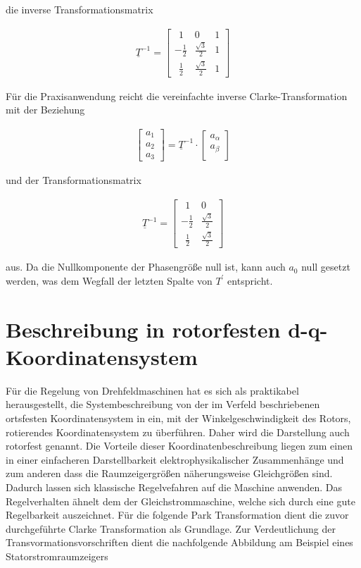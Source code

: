 die inverse Transformationsmatrix

\begin{align}
	\underline{T}^{-1} =
	\begin{bmatrix}
		~~1 & 0 & 1  \\
		-\frac{1}{2} & \frac{\sqrt{3}}{2} & 1 \\
		~~\frac{1}{2} & \frac{\sqrt{3}}{2} & 1
	\end{bmatrix}
	\label{inverseclarkematrixnull}
\end{align}

Für die Praxisanwendung reicht die vereinfachte inverse Clarke-Transformation mit der Beziehung

\begin{align}
	\begin{bmatrix}
		a_{1} \\
		a_{2} \\
		a_{3}
	\end{bmatrix}
	=\underline{T}^{-1}\cdot 
	\begin{bmatrix}
		a_{\alpha} \\
		a_{\beta} \\
	\end{bmatrix}
	\label{inverseclarkevektornulleinfach}
\end{align}
 
 und der Transformationsmatrix 
 
 \begin{align}
 	\underline{T}^{-1} =
 	\begin{bmatrix}
 		~~1 & 0   \\
 		-\frac{1}{2} & \frac{\sqrt{3}}{2}  \\
 		~~\frac{1}{2} & \frac{\sqrt{3}}{2} 
 	\end{bmatrix}
 	\label{inverseclarkematrixnulleinfach}
 \end{align}
 
 aus. Da die Nullkomponente der Phasengröße null ist, kann auch $a_{0}$ null gesetzt werden, was dem Wegfall der letzten Spalte von ${T^\prime}$ entspricht.

\section{Beschreibung in rotorfesten d-q-Koordinatensystem}\label{sec:park}

Für die Regelung von Drehfeldmaschinen hat es sich als praktikabel herausgestellt, die Systembeschreibung von der im Verfeld beschriebenen ortsfesten Koordinatensystem in ein, mit der Winkelgeschwindigkeit des Rotors, rotierendes Koordinatensystem zu überführen. 
Daher wird die Darstellung auch rotorfest genannt. 
Die Vorteile dieser Koordinatenbeschreibung liegen zum einen in einer einfacheren Darstellbarkeit elektrophysikalischer Zusammenhänge und zum anderen dass die Raumzeigergrößen näherungsweise Gleichgrößen sind.
Dadurch lassen sich klassische Regelvefahren auf die Maschine anwenden.
Das Regelverhalten ähnelt dem der Gleichstrommaschine, welche sich durch eine gute Regelbarkeit auszeichnet. 
Für die folgende Park Transformation dient die zuvor durchgeführte Clarke Transformation als Grundlage. 
Zur Verdeutlichung der Transvormationsvorschriften dient die nachfolgende Abbildung am Beispiel eines Statorstromraumzeigers

